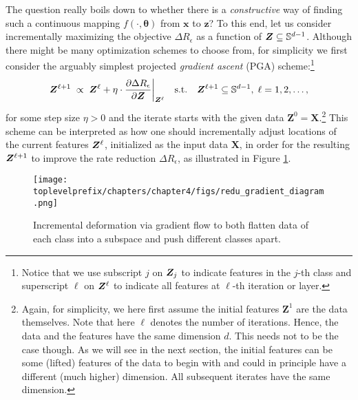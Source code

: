 \documentclass[../../book-main.tex]{subfiles}
\begin{document}
The question really boils down to whether there is a {\em constructive} way of finding such a continuous mapping $f(\cdot,\bm \theta)$ from $\bm x$ to $\bm z$? To this end, let us consider incrementally maximizing the objective $\Delta R_{\epsilon}$ as a function of $\bm{Z} \subseteq \mathbb{S}^{d-1}$. Although there might be many optimization schemes to choose from, for simplicity we first consider the arguably simplest projected {\em gradient ascent} (PGA)  scheme:\footnote{Notice that we use subscript $j$ on $\bm{Z}_j$ to indicate features in the $j$-th class and superscript $\ell$ on $\bm{Z}^{\ell}$ to indicate all features at $\ell$-th iteration or layer.} 
\begin{equation}
\bm Z^{\ell+1}   \; \propto \; \bm Z^{\ell} + \eta \cdot \frac{\partial \Delta R_{\epsilon}}{\partial \bm Z}\bigg|_{\bm{Z}^{\ell}}
\quad \mbox{s.t.} \quad \bm{Z}^{\ell+1} \subseteq \mathbb{S}^{d-1}, \; \ell = 1, 2, \ldots,
\label{eqn:gradient-descent}
\end{equation}
for some step size $\eta >0$ and the iterate starts with the given data $\bm Z^{0} = \bm X$.\footnote{Again, for simplicity, we here first assume the initial features $\bm Z^{1}$ are the data themselves. Note that here $\ell$ denotes the number of iterations. Hence, the data and the features have the same dimension $d$. This needs not to be the case though. As we will see in the next section, the initial features can be some (lifted) features of the data to begin with and could in principle have a different (much higher) dimension. All subsequent iterates have the same dimension.}
This scheme can be interpreted as how one should incrementally adjust locations of the current features $\bm{Z}^\ell$, initialized as the input data $\bm X$, in order for the resulting $\bm{Z}^{\ell +1}$ to improve the rate reduction $\Delta R_{\epsilon}$, as illustrated in Figure \ref{fig:gradient-flow}. 
\begin{figure}
\centering
    \texttt{[image: \\toplevelprefix/chapters/chapter4/figs/redu\_gradient\_diagram.png]} 
    \caption{Incremental deformation via gradient flow to both flatten data of each class into a subspace and push different classes apart.} 
    \label{fig:gradient-flow}
\end{figure} 

\end{document}
